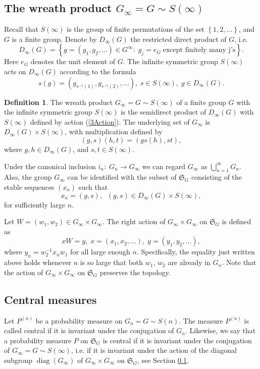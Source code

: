 \documentclass[12pt]{amsart}
\theoremstyle{definition}
\newtheorem{defn}[thm]{Definition}
\numberwithin{equation}{section}
\DeclareMathOperator{\diag}{diag}
\begin{document}
\subsection{The wreath product $G_{\infty}=G\sim S(\infty)$}\label{SubSectionWreathInfty}
Recall that $S(\infty)$ is the group of finite permutations of the set $\left\{1,2,\ldots\right\}$, and $G$ is a finite group.
Denote by $D_{\infty}\left(G\right)$ the restricted direct product of $G$, i.e.
$$
D_{\infty}\left(G\right)=\left\{g=\left(g_1,g_2,\ldots\right)\in G^{\infty}:\;g_j=e_{G}\;\mbox{except  finitely many j's}
\right\}.
$$
Here $e_{G}$ denotes the unit element of $G$. The infinite symmetric group $S(\infty)$ acts on
$D_{\infty}\left(G\right)$ according to the formula
\begin{equation}\label{3Action}
s(g)=\left(g_{s^{-1}(1)},g_{s^{-1}(2)},\ldots \right),\; s\in S(\infty),\; g\in D_{\infty}\left(G\right).
\end{equation}
\begin{defn}
The wreath product $G_{\infty}=G\sim S(\infty)$ of a finite group $G$ with the infinite symmetric group $S(\infty)$ is the semidirect product of $D_{\infty}\left(G\right)$ with $S(\infty)$ defined by action (\ref{3Action}). The underlying set of $G_{\infty}$ is $D_{\infty}\left(G\right)\times S(\infty)$, with multiplication defined by
$$
\left(g,s\right)\left(h,t\right)=\left(gs(h),st\right),
$$
where $g, h\in D_{\infty}\left(G\right)$, and $s, t\in S(\infty)$.
\end{defn}
Under the canonical inclusion $i_n:\; G_{n}\longrightarrow G_{\infty}$ we can regard $G_{\infty}$ as $\bigcup_{n=1}^{\infty}G_n$. Also, the group $G_{\infty}$ can be identified with the subset of $\mathfrak{S}_{G}$ consisting of  the stable sequences $\left(x_n\right)$ such that
$$
x_n=\left(g,s\right), \;\; \left(g,s\right)\in D_{\infty}\left(G\right)\times S(\infty),
$$
for sufficiently large $n$.

Let $W=\left(w_1,w_2\right)\in G_{\infty}\times G_{\infty}$. The right action of $G_{\infty}\times G_{\infty}$ on $\mathfrak{S}_{G}$ is defined as
$$
xW=y,\; x=\left(x_1,x_2,\ldots\right),\;y=\left(y_1,y_2,\ldots\right),
$$
where $y_n=w_2^{-1}x_nw_1$ for all large enough $n$. Specifically, the equality just written above holds whenever $n$ is so large that both $w_1$, $w_2$ are already in $G_n$. Note that
the action of $G_{\infty}\times G_{\infty}$ on $\mathfrak{S}_{G}$ preserves the topology.
\subsection{Central measures}
Let $P^{(n)}$ be a probability measure on $G_n=G\sim S(n)$. The measure $P^{(n)}$ is called central if it is invariant under the conjugation of $G_n$. Likewise, we say that a probability measure $P$ on $\mathfrak{S}_{G}$ is central if it is invariant under the conjugation of $G_{\infty}=G\sim S(\infty)$, i.e. if it is invariant under the action of
the diagonal subgroup $\diag\left(G_{\infty}\right)$ of $G_{\infty}\times G_{\infty}$
on $\mathfrak{S}_{G}$, see Section \ref{SubSectionWreathInfty}.
\end{document}
